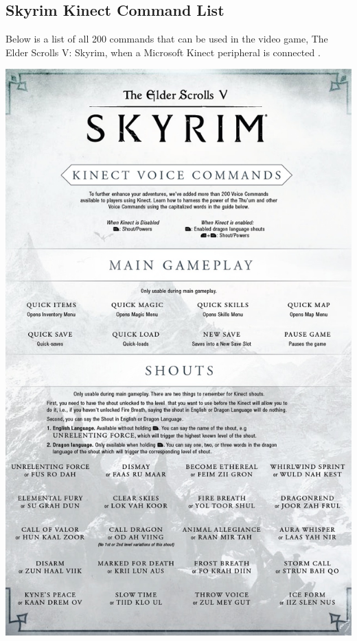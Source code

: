\documentclass[11pt]{article}
\begin{document}
\subsection{Skyrim Kinect Command List}
\label{appendix:skyrim}
Below is a list of all 200 commands that can be used in the video game, The Elder Scrolls V: Skyrim, when a Microsoft Kinect peripheral is connected \cite{RefWorks:24}.

\includegraphics[scale=0.235]{skyrim-1.jpg}
\end{document}
